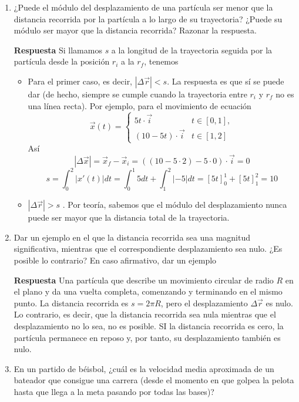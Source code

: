 \documentclass{article}
\begin{document}
\begin{enumerate}
	\item ¿Puede el módulo del desplazamiento de una partícula ser menor que la distancia recorrida por la partícula a lo largo de su trayectoria? ¿Puede su módulo ser mayor que la distancia recorrida? Razonar la respuesta.
	
	\textbf{Respuesta}
	Si llamamos $s$ a la longitud de la trayectoria seguida por la partícula desde la posición $r_i$ a la $r_f$, tenemos
	\begin{itemize}
		\item Para el primer caso, es decir, $|\Delta \vec{r}| < s$. La respuesta es que sí se puede dar (de hecho, siempre se cumple cuando la trayectoria entre $r_i$ y $r_f$ no es una línea recta). Por ejemplo, para el movimiento de ecuación
		$$\vec{x}(t)=\begin{cases}
			5t \cdot \vec{i} & t \in [0,1], \\
			(10-5t) \cdot \vec{i} & t \in [1,2]
		\end{cases}$$
		Así
		$$|\Delta \vec{x}|=\vec{x}_f-\vec{x}_i=((10-5\cdot 2)-5\cdot 0)\cdot \vec{i}=0$$
		$$s = \int_0^2 |x'(t)|dt=\int_0^1 5dt + \int_1^2 |-5|dt=[5t]_0^1+[5t]_1^2=10$$

		\item $|\Delta \vec{r}| > s$ . Por teoría, sabemos que el módulo del desplazamiento nunca puede ser mayor que la distancia total de la trayectoria.
	
	\end{itemize}

	\item Dar un ejemplo en el que la distancia recorrida sea una magnitud significativa, mientras que el correspondiente desplazamiento sea nulo. ¿Es posible lo contrario? En caso afirmativo, dar un ejemplo
	
	\textbf{Respuesta}
	Una partícula que describe un movimiento circular de radio $R$ en el plano y da una vuelta completa, comenzando y terminando en el mismo punto. La distancia recorrida es $s=2\pi R$, pero el desplazamiento $\Delta \vec{r}$ es nulo. Lo contrario, es decir, que la distancia recorrida sea nula mientras que el desplazamiento no lo sea, no es posible. SI la distancia recorrida es cero, la partícula permanece en reposo y, por tanto, su desplazamiento también es nulo.

	\item En un partido de béisbol, ¿cuál es la velocidad media aproximada de un bateador que consigue una carrera (desde el momento en que golpea la pelota hasta que llega a la meta pasando por todas las bases)?


\end{enumerate}
\end{document}
